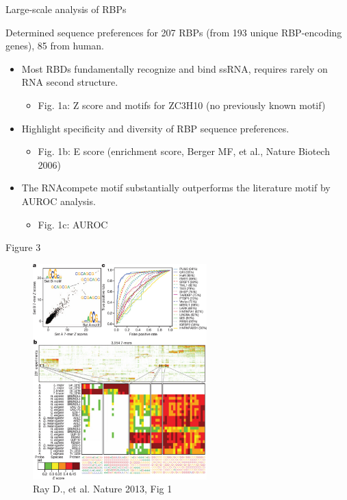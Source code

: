\documentclass[professionalfont, 12pt, default]{beamer}
\providecommand{\tightlist}{%
    \setlength{\itemsep}{0pt}\setlength{\parskip}{0pt}}
\begin{document}
\begin{frame}{Large-scale analysis of RBPs}

Determined sequence preferences for 207 RBPs (from 193 unique
RBP-encoding genes), 85 from human.

\begin{itemize}
\tightlist
\item
  Most RBDs fundamentally recognize and bind ssRNA, requires rarely on
  RNA second structure.

  \begin{itemize}
  \tightlist
  \item
    Fig. 1a: Z score and motifs for ZC3H10 (no previously known motif)
  \end{itemize}
\item
  Highlight specificity and diversity of RBP sequence preferences.

  \begin{itemize}
  \tightlist
  \item
    Fig. 1b: E score (enrichment score, Berger MF, et al., Nature
    Biotech 2006)
  \end{itemize}
\item
  The RNAcompete motif substantially outperforms the literature motif by
  AUROC analysis.

  \begin{itemize}
  \tightlist
  \item
    Fig. 1c: AUROC
  \end{itemize}
\end{itemize}

\end{frame}

\begin{frame}{Figure 3}

\begin{figure}
\centering
\includegraphics[width=0.60000\textwidth]{img/f1.jpg}
\caption{Ray D., et al. Nature 2013, Fig 1}
\end{figure}

\end{frame}
\end{document}
